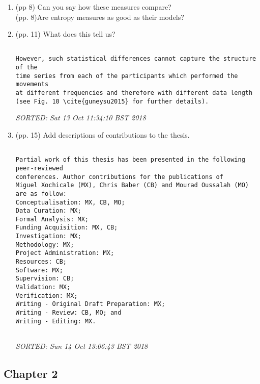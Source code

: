 \documentclass[10pt]{article}
\begin{document}
\begin{enumerate}

\item  (pp 8) Can you say how these measures compare? \\

	(pp. 8)Are entropy measures as good as their models?


\item (pp. 11) What does this tell us?

\begin{verbatim}

However, such statistical differences cannot capture the structure of the 
time series from each of the participants which performed the movements
at different frequencies and therefore with different data length
(see Fig. 10 \cite{guneysu2015} for further details).

\end{verbatim}
\textit{
SORTED: 
Sat 13 Oct 11:34:10 BST 2018
}
\\




\item (pp. 15) Add descriptions of contributions to the thesis.

\begin{verbatim}

Partial work of this thesis has been presented in the following peer-reviewed 
conferences. Author contributions for the publications of 
Miguel Xochicale (MX), Chris Baber (CB) and Mourad Oussalah (MO) are as follow:
Conceptualisation: MX, CB, MO;
Data Curation: MX;
Formal Analysis: MX;
Funding Acquisition: MX, CB;
Investigation: MX;
Methodology: MX;
Project Administration: MX;
Resources: CB;
Software: MX;
Supervision: CB;
Validation: MX;
Verification: MX;
Writing - Original Draft Preparation: MX;
Writing - Review: CB, MO; and 
Writing - Editing: MX.


\end{verbatim}
\textit{
SORTED: 
Sun 14 Oct 13:06:43 BST 2018
}
\\




\end{enumerate}


\subsection{Chapter 2}
\end{document}
